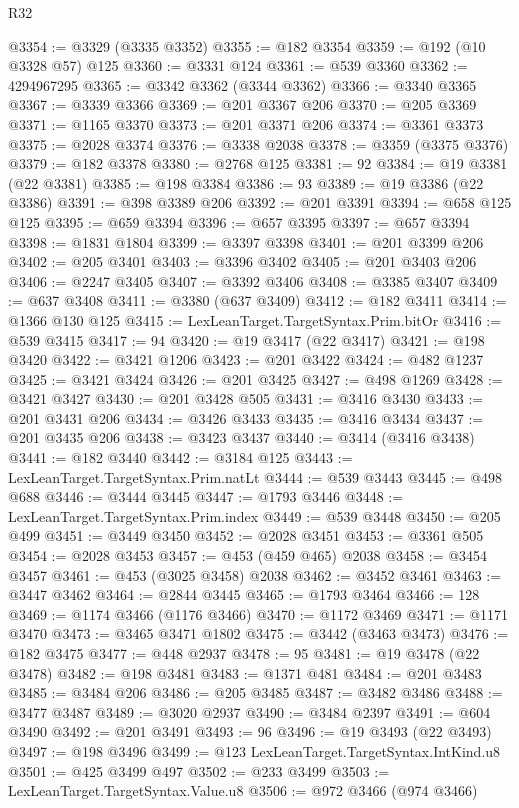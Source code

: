 \begin{lexlean}{R32}
\begin{coremodule}
@3354 := @3329 (@3335 @3352)
@3355 := @182 @3354
@3359 := @192 (@10 @3328 @57) @125
@3360 := @3331 @124
@3361 := @539 @3360
@3362 := 4294967295
@3365 := @3342 @3362 (@3344 @3362)
@3366 := @3340 @3365
@3367 := @3339 @3366
@3369 := @201 @3367 @206
@3370 := @205 @3369
@3371 := @1165 @3370
@3373 := @201 @3371 @206
@3374 := @3361 @3373
@3375 := @2028 @3374
@3376 := @3338 @2038
@3378 := @3359 (@3375 @3376)
@3379 := @182 @3378
@3380 := @2768 @125
@3381 := 92
@3384 := @19 @3381 (@22 @3381)
@3385 := @198 @3384
@3386 := 93
@3389 := @19 @3386 (@22 @3386)
@3391 := @398 @3389 @206
@3392 := @201 @3391
@3394 := @658 @125 @125
@3395 := @659 @3394
@3396 := @657 @3395
@3397 := @657 @3394
@3398 := @1831 @1804
@3399 := @3397 @3398
@3401 := @201 @3399 @206
@3402 := @205 @3401
@3403 := @3396 @3402
@3405 := @201 @3403 @206
@3406 := @2247 @3405
@3407 := @3392 @3406
@3408 := @3385 @3407
@3409 := @637 @3408
@3411 := @3380 (@637 @3409)
@3412 := @182 @3411
@3414 := @1366 @130 @125
@3415 := LexLeanTarget.TargetSyntax.Prim.bitOr
@3416 := @539 @3415
@3417 := 94
@3420 := @19 @3417 (@22 @3417)
@3421 := @198 @3420
@3422 := @3421 @1206
@3423 := @201 @3422
@3424 := @482 @1237
@3425 := @3421 @3424
@3426 := @201 @3425
@3427 := @498 @1269
@3428 := @3421 @3427
@3430 := @201 @3428 @505
@3431 := @3416 @3430
@3433 := @201 @3431 @206
@3434 := @3426 @3433
@3435 := @3416 @3434
@3437 := @201 @3435 @206
@3438 := @3423 @3437
@3440 := @3414 (@3416 @3438)
@3441 := @182 @3440
@3442 := @3184 @125
@3443 := LexLeanTarget.TargetSyntax.Prim.natLt
@3444 := @539 @3443
@3445 := @498 @688
@3446 := @3444 @3445
@3447 := @1793 @3446
@3448 := LexLeanTarget.TargetSyntax.Prim.index
@3449 := @539 @3448
@3450 := @205 @499
@3451 := @3449 @3450
@3452 := @2028 @3451
@3453 := @3361 @505
@3454 := @2028 @3453
@3457 := @453 (@459 @465) @2038
@3458 := @3454 @3457
@3461 := @453 (@3025 @3458) @2038
@3462 := @3452 @3461
@3463 := @3447 @3462
@3464 := @2844 @3445
@3465 := @1793 @3464
@3466 := 128
@3469 := @1174 @3466 (@1176 @3466)
@3470 := @1172 @3469
@3471 := @1171 @3470
@3473 := @3465 @3471 @1802
@3475 := @3442 (@3463 @3473)
@3476 := @182 @3475
@3477 := @448 @2937
@3478 := 95
@3481 := @19 @3478 (@22 @3478)
@3482 := @198 @3481
@3483 := @1371 @481
@3484 := @201 @3483
@3485 := @3484 @206
@3486 := @205 @3485
@3487 := @3482 @3486
@3488 := @3477 @3487
@3489 := @3020 @2937
@3490 := @3484 @2397
@3491 := @604 @3490
@3492 := @201 @3491
@3493 := 96
@3496 := @19 @3493 (@22 @3493)
@3497 := @198 @3496
@3499 := @123 LexLeanTarget.TargetSyntax.IntKind.u8
@3501 := @425 @3499 @497
@3502 := @233 @3499
@3503 := LexLeanTarget.TargetSyntax.Value.u8
@3506 := @972 @3466 (@974 @3466)

\end{coremodule}
\end{lexlean}

